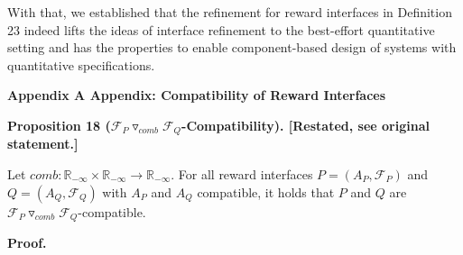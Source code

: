 \documentclass[10pt,a4paper]{article}
\begin{document}
 

 
 
With that, we established that the refinement for reward interfaces in Definition 23 indeed lifts the ideas of interface refinement to the best-effort quantitative setting and has the properties to enable component-based design of systems with quantitative specifications.\par
 
 



 
\par\medskip\noindent\textbf{Appendix A Appendix: Compatibility of Reward Interfaces}\par
 
 
 
\par\medskip\noindent\textbf{Proposition 18 (${{\mathcal{F}_{P}}\mathbin{\triangledown_{\mathit{comb}}}{\mathcal{F}_{Q}}}$-Compatibility). [Restated, see original statement.]}\par
 
 
Let $\mathit{comb}:\mathbb{R}_{-\infty}\times\mathbb{R}_{-\infty}\to\mathbb{R}_{-\infty}$. For all reward interfaces $P=(A_{P},\mathcal{F}_{P})$ and $Q=(A_{Q},\mathcal{F}_{Q})$ with $A_{P}$ and $A_{Q}$ compatible, it holds that $P$ and $Q$ are ${{\mathcal{F}_{P}}\mathbin{\triangledown_{\mathit{comb}}}{\mathcal{F}_{Q}}}$-compatible.\par
 
 
 
 
 
\par\medskip\noindent\textbf{Proof.}\par
 
 
\end{document}
